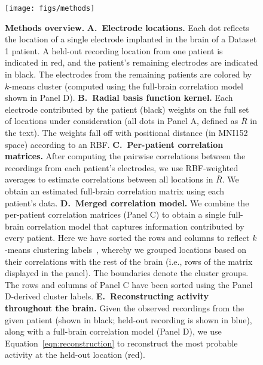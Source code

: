 \documentclass[11pt]{article}
\begin{document}
\begin{figure}
  \centering \texttt{[image: figs/methods]}
  \caption{\textbf{Methods overview.}  \textbf{A.~Electrode locations.}  Each
  dot reflects the location of a single electrode implanted in the brain of a
  Dataset 1 patient.  A held-out recording location from one patient is
  indicated in red, and the patient's remaining electrodes are indicated in
  black. The electrodes from the remaining patients are colored by $k$-means
  cluster (computed using the full-brain correlation model shown in Panel D).
  \textbf{B.~Radial basis function kernel.} Each electrode contributed by the
  patient (black) weights on the full set of locations under consideration (all
  dots in Panel A, defined as $\overline{R}$ in the text).  The weights fall off with
  positional distance (in MNI152 space) according to an RBF. \textbf{C.~Per-patient
  correlation matrices.}  After computing the pairwise correlations between the
  recordings from each patient's electrodes, we use RBF-weighted averages to
  estimate correlations between all locations in $\overline{R}$.  We obtain an
  estimated full-brain correlation matrix using each patient's data.
  \textbf{D.~Merged correlation model.}  We combine the per-patient correlation
  matrices (Panel C) to obtain a single full-brain correlation model that
  captures information contributed by every patient.  Here we have sorted the
  rows and columns to reflect $k$-means clustering labels~\citep[using
  $k$=7;][]{YeoEtal11}, whereby we grouped locations based on their correlations
  with the rest of the brain (i.e., rows of the matrix displayed in the panel).
  The boundaries denote the cluster groups.  The rows and columns of Panel C
  have been sorted using the Panel D-derived cluster labels.
  \textbf{E.~Reconstructing activity throughout the brain.}  Given the observed
  recordings from the given patient (shown in black; held-out recording is shown
  in blue), along with a full-brain correlation model (Panel D), we use
  Equation~\ref{eqn:reconstruction} to reconstruct the most probable activity at
  the held-out location (red).} \label{fig:methods}
\end{figure}
\end{document}
